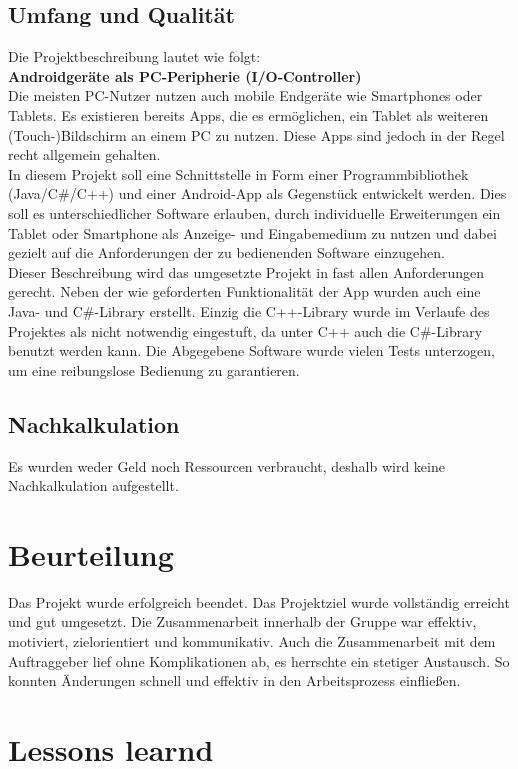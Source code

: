\documentclass{scrartcl}
\begin{document}
\subsection{Umfang und Qualität}
Die Projektbeschreibung lautet wie folgt:\\
\textbf{Androidgeräte als PC-Peripherie (I/O-Controller)}\\
Die meisten PC-Nutzer nutzen auch mobile Endgeräte wie Smart­phones oder Tablets. Es existieren bereits Apps, die es ermöglichen, ein Tablet als weiteren (Touch-)Bildschirm an einem PC zu nutzen. Diese Apps sind jedoch in der Regel recht allgemein gehalten.\\
In diesem Projekt soll eine Schnittstelle in Form einer Programm­bibliothek (Java/C\#/C++) und einer Android-App als Gegenstück entwickelt werden. Dies soll es unterschiedlicher Software erlauben, durch individuelle Erweiterungen ein Tablet oder Smartphone als Anzeige- und Eingabe­medium zu nutzen und dabei gezielt auf die Anforderungen der zu bedienenden Software einzugehen.\\
Dieser Beschreibung wird das umgesetzte Projekt in fast allen Anforderungen gerecht. Neben der wie geforderten Funktionalität der App wurden auch eine Java- und C\#-Library erstellt. Einzig die C++-Library wurde im Verlaufe des Projektes als nicht notwendig eingestuft, da unter C++ auch die C\#-Library benutzt werden kann.
Die Abgegebene Software wurde vielen Tests unterzogen, um eine reibungslose Bedienung zu garantieren.


\subsection{Nachkalkulation}
Es wurden weder Geld noch Ressourcen verbraucht, deshalb wird keine Nachkalkulation aufgestellt.

\section{Beurteilung}
Das Projekt wurde erfolgreich beendet. Das Projektziel wurde vollständig erreicht und gut umgesetzt. Die Zusammenarbeit innerhalb der Gruppe war effektiv, motiviert, zielorientiert und kommunikativ. Auch die Zusammenarbeit mit dem Auftraggeber lief ohne Komplikationen ab, es herrschte ein stetiger Austausch. So konnten Änderungen schnell und effektiv in den Arbeitsprozess einfließen.
\section{Lessons learnd}
\end{document}
